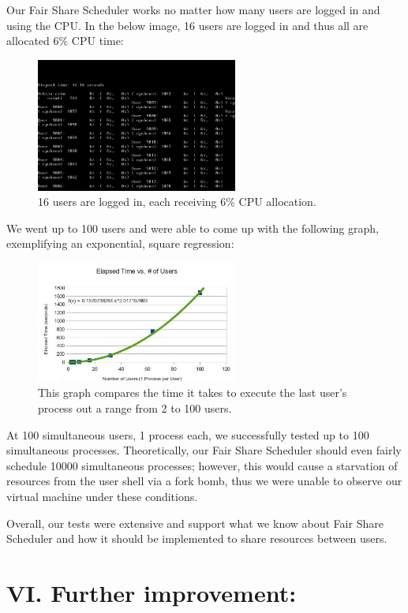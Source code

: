 \documentclass[10pt]{article}
\begin{document}
Our Fair Share Scheduler works no matter how many users are logged in and using the CPU. In the below image, 16 users are logged in and thus all are allocated 6\% CPU time:

\begin{figure}[H]
 \caption{16 users are logged in, each receiving 6\% CPU allocation.}
 \centering
 \includegraphics[width=250px]{fssch.jpg}
\end{figure}

We went up to 100 users and were able to come up with the following graph,
exemplifying an exponential, square regression:

\begin{figure}[H]
 \caption{This graph compares the time it takes to execute the last user's process out a range from 2 to 100 users.}
 \centering
 \includegraphics[width=250px]{graph.jpg}
\end{figure}

At 100 simultaneous users, 1 process each, we successfully tested up to 100 simultaneous processes. Theoretically, our Fair Share Scheduler should even fairly schedule 10000 simultaneous processes; however, this would cause a
starvation of resources from the user shell via a fork bomb, thus we were
unable to observe our virtual machine under these conditions. 

Overall, our tests were extensive and support what we know about Fair Share
Scheduler and how it should be implemented to share resources between users.  


\section{VI. Further improvement:}
\end{document}
